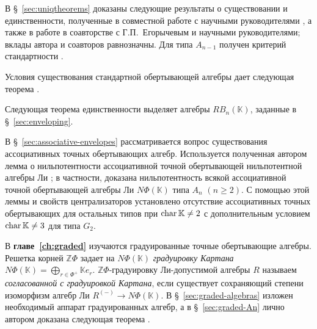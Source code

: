 
    В \S~\ref{sec:uniqtheorems} доказаны следующие результаты о существовании и
    единственности, полученные в совместной работе с научными руководителями
    \cite{imm2020}, а также в работе \cite{smj2023} в соавторстве с
    Г.\nobreak\:П.~Егорычевым и научными руководителями; вклады автора и соавторов
    равнозначны. Для типа $A_{n-1}$ получен критерий стандартности
    \cite[теорема~1]{imm2020}.


    Условия существования стандартной обертывающей алгебры дает следующая теорема
    \cite[предложение~2]{smj2023}.


    Следующая теорема единственности \cite[теорема~5]{smj2023} выделяет алгебры
    $RB_n(\mathbb{K})$, заданные в \S~\ref{sec:enveloping}.


    В \S~\ref{sec:associative-envelopes} рассматривается вопрос существования
    ассоциативных точных обертывающих алгебр. Используется полученная автором лемма
    о нильпотентности ассоциативной точной обертывающей нильпотентной алгебры Ли
    \cite[лемма~2.7]{jsfu2026}; в частности, доказана нильпотентность всякой
    ассоциативной точной обертывающей алгебры Ли $N\Phi(\mathbb{K})$ типа $A_n$
    $(n\geq2)$. С помощью этой леммы и свойств централизаторов установлено
    отсутствие ассоциативных точных обертывающих для остальных типов при
    $\operatorname{char}\mathbb{K}\neq2$ с дополнительным условием $\operatorname{char}\mathbb{K}\neq3$ для
    типа $G_2$.

    В \textbf{главе~\ref{ch:graded}} изучаются градуированные точные обертывающие
    алгебры. Решетка корней $\mathbb{Z}\Phi$ задает на $N\Phi(\mathbb{K})$
    \emph{градуировку Картана}
    $N\Phi(\mathbb{K})=\bigoplus_{r\in\Phi^+}\mathbb{K}e_r$.
    $\mathbb{Z}\Phi$-градуировку Ли-допустимой алгебры $R$ называем
    \emph{согласованной с градуировкой Картана}, если существует сохраняющий
    степени изоморфизм алгебр Ли $R^{(-)}\to N\Phi(\mathbb{K})$. В
    \S~\ref{sec:graded-algebras} изложен необходимый аппарат градуированных алгебр,
    а в \S~\ref{sec:graded-An} лично автором доказана следующая теорема
    \cite[теорема~2]{jsfu2026}.


